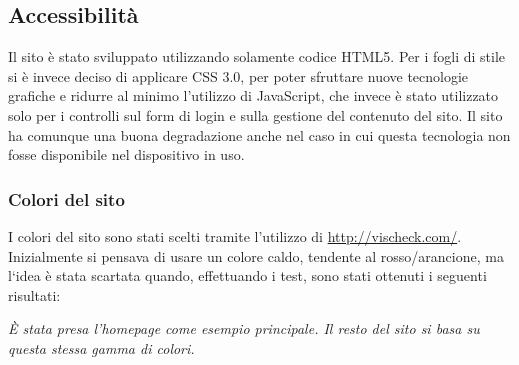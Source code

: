 \graphicspath{ {res/img/} }

\subsection{Accessibilità}
Il sito è stato sviluppato utilizzando solamente codice HTML5. Per i fogli di stile si è invece deciso di applicare CSS 3.0, per poter sfruttare nuove tecnologie grafiche e ridurre al minimo l'utilizzo di JavaScript, che invece è stato utilizzato solo per i controlli sul form di login e sulla gestione del contenuto del sito. Il sito ha comunque una buona degradazione anche nel caso in cui questa tecnologia non fosse disponibile nel dispositivo in uso.

\subsubsection{Colori del sito}
I colori del sito sono stati scelti tramite l'utilizzo di \url{http://vischeck.com/}. Inizialmente si pensava di usare un colore caldo, tendente al rosso/arancione, ma l`idea \`e stata scartata quando, effettuando i test, sono stati ottenuti i seguenti risultati:

\textit{\`E stata presa l'homepage come esempio principale. Il resto del sito si basa su questa stessa gamma di colori.}

